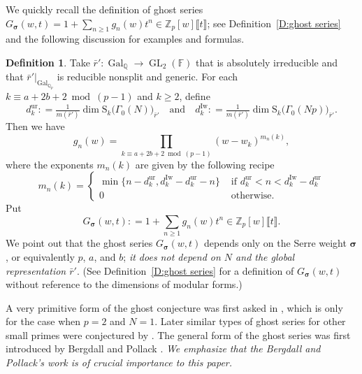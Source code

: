 \documentclass[12pt]{amsart}
\theoremstyle{definition}
\newtheorem{definition}[subsection]{Definition}
\numberwithin{equation}{subsection}
\def\FF{\mathbb{F}}
\def\QQ{\mathbb{Q}}
\def\ZZ{\mathbb{Z}}
\def\rmS{\mathrm{S}}
\DeclareMathOperator{\Gal}{Gal}
\DeclareMathOperator{\GL}{GL}
\newcommand{\bbsigma}{\boldsymbol{\sigma}}
\newcommand{\Iw}{\mathrm{Iw}}
\newcommand{\ur}{\mathrm{ur}}
\begin{document}

We quickly recall the definition of ghost series $G_{\bbsigma}(w,t) =1+ \sum\limits_{n \geq 1} g_n(w)t^n \in \ZZ_p[w]\llbracket t\rrbracket$; see Definition~\ref{D:ghost series} and the following discussion for examples and formulas.
\begin{definition}
\label{D:ghost series intro}
Take $\bar r': \Gal_\QQ \to \GL_2(\FF)$ that is absolutely irreducible and that $\bar r'|_{\Gal_{\QQ_p}}$ is reducible nonsplit and generic.  
For each $k \equiv a+2b+2 \bmod (p-1)$ and $k \geq 2$, define
$$
d_{k}^\ur: = \tfrac1{m(\bar r')} {\dim \rmS_k\big(\Gamma_0(N)\big)_{\bar r'}} \quad \textrm{and}\quad d_{k}^\Iw: = \tfrac1{m(\bar r')} {\dim \rmS_k\big(\Gamma_0(Np)\big)_{\bar r'}}.
$$
Then we have
$$
g_n(w) = \prod_{k \equiv a+2b+2 \bmod (p-1)} (w-w_k)^{m_n(k)},
$$
where the exponents $m_n(k)$ are given by the following recipe
\[
m_n(k) = \begin{cases}
\min\big\{ n -d_{k}^\ur , d_{k}^\Iw- d_{k}^\ur - n\big\} & \textrm{ if }d_{k}^\ur < n < d_{k}^\Iw - d_{k}^\ur
\\
0 & \textrm{ otherwise.}
\end{cases}
\]
Put
$$
G_{\bbsigma}(w,t): = 1+ \sum_{ n \geq 1} g_n(w) t^n \in \ZZ_p[w] \llbracket t \rrbracket.
$$
We point out that the ghost series $G_{\bbsigma}(w,t)$ depends only on the Serre weight $\bbsigma$, or equivalently $p$, $a$, and $b$; \emph{it does not depend on $N$ and the global representation $\bar r'$}. (See Definition~\ref{D:ghost series} for a definition of $G_{\bbsigma}(w,t)$ without reference to the dimensions of modular forms.)
\end{definition}


A very primitive form of the ghost conjecture was first asked in \cite{buzzard-calegari}, which is only for the case when $p=2$ and $N=1$. Later similar types of ghost series for other small primes were conjectured by \cite{clay, loeffler-slope}.  The general form of the ghost series was first introduced by Bergdall and Pollack \cite{bergdall-pollack2,bergdall-pollack3}. \emph{We emphasize that the Bergdall and Pollack's work is of crucial importance to this paper.}
\end{document}
